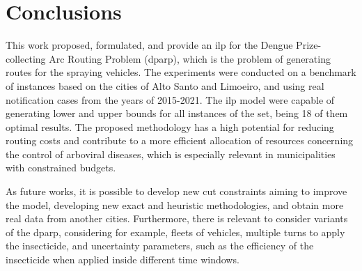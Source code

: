 \documentclass[a4paper,11pt]{article}
\begin{document}
\section{Conclusions} \label{sec:conclusions}

This  work  proposed,  formulated,  and  provide an  \gls{ilp}  for  the  Dengue
Prize-collecting  Arc Routing  Problem (\gls{dparp}),  which is  the problem  of
generating routes for the spraying vehicles. The experiments were conducted on a
benchmark of instances based on the cities of Alto Santo and Limoeiro, and using
real notification  cases from the years  of 2015-2021. The \gls{ilp}  model were
capable of generating lower and upper bounds for all instances of the set, being
18 of  them optimal results. The  proposed methodology has a  high potential for
reducing  routing  costs  and  contribute  to a  more  efficient  allocation  of
resources  concerning the  control of  arboviral diseases,  which is  especially
relevant in municipalities with constrained budgets.

As future works, it is possible to develop new cut constraints aiming to improve
the model,  developing new  exact and heuristic  methodologies, and  obtain more
real  data from  another  cities.  Furthermore, there  is  relevant to  consider
variants  of  the \gls{dparp},  considering  for  example, fleets  of  vehicles,
multiple turns to apply the insecticide, and uncertainty parameters, such as the
efficiency of the insecticide when applied inside different time windows.

\newpage
~\\


\end{document}
